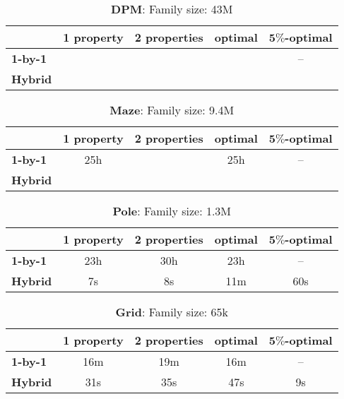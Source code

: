 \begin{table}[ht!]
\centering
\begin{tabular}{l|cccc}
    \hline \hline 
    & \multicolumn{1}{l}{\textbf{1 property}} & \multicolumn{1}{l}{\textbf{2 properties}} & \multicolumn{1}{l}{\textbf{optimal}} & \multicolumn{1}{l}{\textbf{$\mathbf{5\%}$-optimal}} \\ \hline
    \textbf{1-by-1} & & & & \,--\, \\
    \textbf{Hybrid} & & & & \\ \hline \hline
\end{tabular}
\caption{\textbf{DPM}: Family size: 43M}
\end{table}

\begin{table}[ht!]
\centering
\begin{tabular}{l|cccc}
    \hline \hline 
    & \multicolumn{1}{l}{\textbf{1 property}} & \multicolumn{1}{l}{\textbf{2 properties}} & \multicolumn{1}{l}{\textbf{optimal}} & \multicolumn{1}{l}{\textbf{$\mathbf{5\%}$-optimal}} \\ \hline
    \textbf{1-by-1} & 25h & & 25h & \,--\, \\
    \textbf{Hybrid} & & & & \\ \hline \hline
\end{tabular}
\caption{\textbf{Maze}: Family size: 9.4M}
\end{table}

\begin{table}[ht!]
\centering
\begin{tabular}{l|cccc}
    \hline \hline 
    & \multicolumn{1}{l}{\textbf{1 property}} & \multicolumn{1}{l}{\textbf{2 properties}} & \multicolumn{1}{l}{\textbf{optimal}} & \multicolumn{1}{l}{\textbf{$\mathbf{5\%}$-optimal}} \\ \hline
    \textbf{1-by-1} & 23h & 30h & 23h & \,--\, \\
    \textbf{Hybrid} & 7s & 8s & 11m & 60s \\ \hline \hline
\end{tabular}
\caption{\textbf{Pole}: Family size: 1.3M}
\end{table}

\begin{table}[ht!]
\centering
\begin{tabular}{l|cccc}
    \hline \hline 
    & \multicolumn{1}{l}{\textbf{1 property}} & \multicolumn{1}{l}{\textbf{2 properties}} & \multicolumn{1}{l}{\textbf{optimal}} & \multicolumn{1}{l}{\textbf{$\mathbf{5\%}$-optimal}} \\ \hline
    \textbf{1-by-1} & 16m & 19m & 16m & \,--\, \\
    \textbf{Hybrid} & 31s & 35s & 47s & 9s \\ \hline \hline
\end{tabular}
\caption{\textbf{Grid}: Family size: 65k}
\end{table}
    
